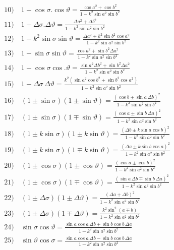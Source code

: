 \documentclass{article}
\begin{document}
\[
\begin{gathered}
\text{10)}\quad1+\cos\sigma.\cos\vartheta=\frac{\cos a^{2}+\cos b^{2}}{1-k^{2}\sin a^{2}\sin b^{2}}\\[1ex]
\text{11)}\quad1+\Delta\sigma.\Delta\vartheta=\frac{\Delta a^{2}+\Delta b^{2}}{1-k^{2}\sin a^{2}\sin b^{2}}\\[1ex]
\text{12)}\quad1-k^{2}\sin\sigma\sin\vartheta=\frac{\Delta a^{2}+k^{2}\sin b^{2}\cos a^{2}}{1-k^{2}\sin a^{2}\sin b^{2}}\\[1ex]
\text{13)}\quad1-\sin\sigma\sin\vartheta=\frac{\cos a^{2}+\sin b^{2}\Delta a^{2}}{1-k^{2}\sin a^{2}\sin b^{2}}\\[1ex]
\text{14)}\quad1-\cos\sigma\cos.\vartheta=\frac{\sin a^{2}\Delta b^{2}+\sin b^{2}\Delta a^{2}}{1-k^{2}\sin a^{2}\sin b^{2}}\\[1ex]
\text{15)}\quad1-\Delta\sigma\,\Delta\vartheta=\frac{k^{2}(\sin a^{2}\cos b^{2}+\sin b^{2}\cos a^{2})}{1-k^{2}\sin a^{2}\sin b^{2}}\\[1ex]
\text{16)}\quad(1\pm\sin\sigma)(1\pm\sin\vartheta)=\frac{(\cos b\pm\sin a\,\Delta b)^{2}}{1-k^{2}\sin a^{2}\sin b^{2}}\\[1ex]
\text{17)}\quad(1\pm\sin\sigma)(1\mp\sin\vartheta)=\frac{(\cos a\pm\sin b\,\Delta a)^{2}}{1-k^{2}\sin a^{2}\sin b^{2}}\\[1ex]
\text{18)}\quad(1\pm k\sin\sigma)(1\pm k\sin\vartheta)=\frac{(\Delta b\pm k\sin a\cos b)^{2}}{1-k^{2}\sin a^{2}\sin b^{2}}\\[1ex]
\text{19)}\quad(1\pm k\sin\sigma)(1\mp k\sin\vartheta)=\frac{(\Delta a\pm k\sin b\cos a)^{2}}{1-k^{2}\sin a^{2}\sin b^{2}}\\[1ex]
\text{20)}\quad(1\pm\cos\sigma)(1\pm\cos\vartheta)=\frac{(\cos a\pm\cos b)^{2}}{1-k^{2}\sin a^{2}\sin b^{2}}\\[1ex]
\text{21)}\quad(1\pm\cos\sigma)(1\mp\cos\vartheta)=\frac{(\sin a\,\Delta b\mp\sin b\,\Delta a)^{2}}{1-k^{2}\sin a^{2}\sin b^{2}}\\[1ex]
\text{22)}\quad(1\pm\Delta\sigma)(1\pm\Delta\vartheta)=\frac{(\Delta a+\Delta b)^{2}}{1-k^{2}\sin a^{2}\sin b^{2}}\\[1ex]
\text{23)}\quad(1\pm\Delta\sigma)(1\mp\Delta\vartheta)=\frac{k^{2}\sin^{2}(a\mp b)}{1-k^{2}\sin a^{2}\sin b^{2}}\\[1ex]
\text{24)}\quad\sin\sigma\cos\vartheta=\frac{\sin a\cos a\,\Delta b+\sin b\cos b\,\Delta a}{1-k^{2}\sin a^{2}\sin b^{2}}\\[1ex]
\text{25)}\quad\sin\vartheta\cos\sigma=\frac{\sin a\cos a\,\Delta b-\sin b\cos b\,\Delta a}{1-k^{2}\sin a^{2}\sin b^{2}}\\[1ex]

\end{gathered}\]
\end{document}
